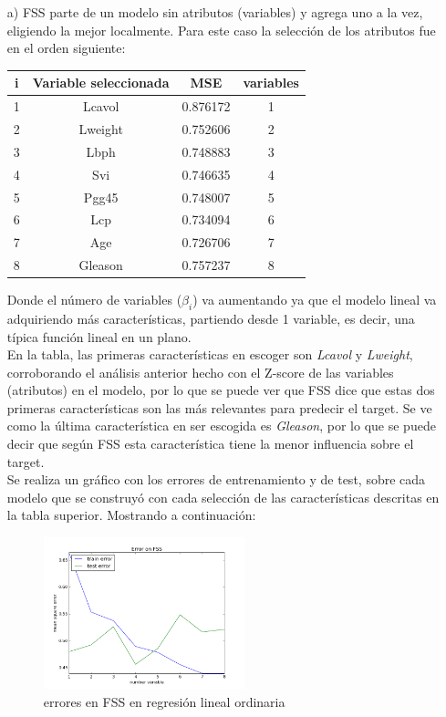 \documentclass[10pt]{article}
\begin{document}
\begin{itemize}
\item[a)] FSS parte de un modelo sin atributos (variables) y agrega uno a la vez, eligiendo la mejor localmente. Para este caso la selección de los atributos fue en el orden siguiente:

\begin{table}[!htb]
 \begin{center}
   \begin{tabular}{|c|c|c|c|} \hline
   i & Variable seleccionada & MSE & variables \\ \hline
   1 & Lcavol & 0.876172 &1 \\
   2 & Lweight & 0.752606 &2 \\
   3 & Lbph & 0.748883 &3 \\
   4 & Svi & 0.746635 &4 \\
   5 & Pgg45 & 0.748007 &5 \\
   6 & Lcp & 0.734094 &6 \\
   7 & Age & 0.726706 &7 \\
   8 & Gleason & 0.757237 &8 \\ \hline 
   \end{tabular}
 \end{center}
\end{table}

Donde el número de variables ($\beta_i$) va aumentando ya que el modelo lineal va adquiriendo más características, partiendo desde 1 variable, es decir, una típica función lineal en un plano.\\
En la tabla, las primeras características en escoger son \textit{Lcavol} y \textit{Lweight}, corroborando el análisis anterior hecho con el Z-score de las variables (atributos) en el modelo, por lo que se puede ver que FSS dice que estas dos primeras características son las más relevantes para predecir el target. Se ve como la última característica en ser escogida es \textit{Gleason}, por lo que se puede decir que según FSS esta característica tiene la menor influencia sobre el target.\\

Se realiza un gráfico con los errores de entrenamiento y de test, sobre cada modelo que se construyó con cada selección de las características descritas en la tabla superior. Mostrando a continuación:

\begin{figure}[!htb]
   \centering
   \includegraphics[width=0.55\textwidth]{images/fss}
   \caption{errores en FSS en regresión lineal ordinaria}
   \label{fig:mesh1}
\end{figure}


\end{itemize}
\end{document}
